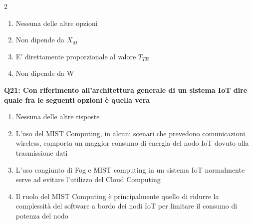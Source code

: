 \documentclass[10pt]{article}
\begin{document}
\begin{multicols}{2}
\begin{enumerate}[label=\arabic*.]
\item Nessuna delle altre opzioni
\item Non dipende da $X_M$
\item E' direttamente proporzionale al valore $T_{TR}$
\item Non dipende da W
\end{enumerate}
\textbf{Q21: Con riferimento all’architettura generale di un sistema IoT dire quale fra le seguenti opzioni è quella vera}

\begin{enumerate}[label=\arabic*.]
\item Nessuna delle altre risposte
\item L’uso del MIST Computing, in alcuni scenari che prevedono comunicazioni wireless, comporta un maggior consumo di energia del nodo IoT dovuto alla trasmissione dati
\item L’uso congiunto di Fog e MIST computing in un sistema IoT normalmente serve ad evitare l’utilizzo del Cloud Computing
\item Il ruolo del MIST Computing è principalmente quello di ridurre la complessità del software a bordo dei nodi IoT per limitare il consumo di potenza del nodo
\end{enumerate}
\end{multicols}

\newpage
\end{document}
